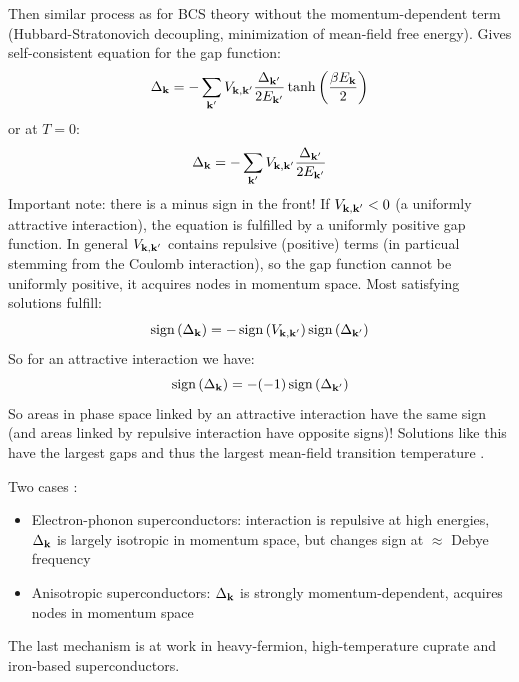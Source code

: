 \documentclass[../main.tex]{subfiles}
\begin{document}
Then similar process as for BCS theory without the momentum-dependent term (Hubbard-Stratonovich decoupling, minimization of mean-field free energy).
Gives self-consistent equation for the gap function:
\begin{equation}
    \Delta_{\bm{\mathrm{k}}} = - \sum_{\bm{\mathrm{k}}^{\prime}} V_{\bm{\mathrm{k}}, \bm{\mathrm{k}}^{\prime}}  \frac{\Delta_{\bm{\mathrm{k}}^{\prime}}}{2 E_{\bm{\mathrm{k}}^{\prime}}} \tanh{\left(\frac{\beta E_{\bm{\mathrm{k}}}}{2}\right)}
\end{equation}
or at \(T = 0\):
\begin{equation}
    \Delta_{\bm{\mathrm{k}}} = - \sum_{\bm{\mathrm{k}}^{\prime}} V_{\bm{\mathrm{k}}, \bm{\mathrm{k}}^{\prime}}  \frac{\Delta_{\bm{\mathrm{k}}^{\prime}}}{2 E_{\bm{\mathrm{k}}^{\prime}}}
\end{equation}
Important note: there is a minus sign in the front!
If \(V_{\bm{\mathrm{k}}, \bm{\mathrm{k}}^{\prime}} < 0\) (a uniformly attractive interaction), the equation is fulfilled by a uniformly positive gap function.
In general \(V_{\bm{\mathrm{k}}, \bm{\mathrm{k}}^{\prime}}\) contains repulsive (positive) terms (in particual stemming from the Coulomb interaction), so the gap function cannot be uniformly positive, it acquires nodes in momentum space.
Most satisfying solutions fulfill:
\begin{equation}
    \operatorname{sign}{(\Delta_{\bm{\mathrm{k}}})} = - \operatorname{sign}{(V_{\bm{\mathrm{k}}, \bm{\mathrm{k}}^{\prime}})} \operatorname{sign}{(\Delta_{\bm{\mathrm{k}}^{\prime}})}
\end{equation}
So for an attractive interaction we have:
\begin{equation}
    \operatorname{sign}{(\Delta_{\bm{\mathrm{k}}})} = -(-1) \operatorname{sign}{(\Delta_{\bm{\mathrm{k}}^{\prime}})}
\end{equation}
So areas in phase space linked by an attractive interaction have the same sign (and areas linked by repulsive interaction have opposite signs)!
Solutions like this have the largest gaps and thus the largest mean-field transition temperature  .

Two cases :
\begin{itemize}
    \item Electron-phonon superconductors: interaction is repulsive at high energies, \(\Delta_{\bm{\mathrm{k}}}\) is largely isotropic in momentum space, but changes sign at \(\approx\) Debye frequency
    \item Anisotropic superconductors: \(\Delta_{\bm{\mathrm{k}}}\) is strongly momentum-dependent, acquires nodes in momentum space
\end{itemize}
The last mechanism is at work in heavy-fermion, high-temperature cuprate  and iron-based superconductors.
\end{document}
